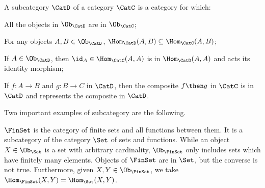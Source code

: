 \begin{ctdefinition}[Subcategory]
\label{def:subcategory}
A subcategory $\CatD$ of a category $\CatC$ is a category for which:
\begin{compactenum}
    \item All the objects in $\Ob_\CatD$ are in $\Ob_\CatC$;
    \item For any objects $A,B\in \Ob_\CatD$, $\Hom_\CatD(A,B)\subseteq \Hom_\CatC(A,B)$;
    \item If $A\in \Ob_\CatD$, then $\id_A\in \Hom_\CatC(A,A)$ is in $\Hom_\CatD(A,A)$ and acts its identity morphism;
    \item If $f\colon A\to B$ and $g\colon B\to C$ in $\CatD$, then the composite $f\then g$ in $\CatC$ is in $\CatD$ and represents the composite in $\CatD$.
\end{compactenum}
\end{ctdefinition}

\begin{comment}
\begin{ctdefinition}[Subcategory]
\label{def:subcategory}
	Given a category~$\Cat{C}$, a \emph{subcategory}~$\Cat{B}$ consists of a subcollection of the collection of objects and morphisms of~$\Cat{C}$ such that:
	\begin{enumerate}[(i)]
	\item If a morphism~$f \colon x\to y$ is in $\Cat{B}$, then so are the objects~$x$ and~$y$.
	\item If the morphisms~$f\colon x\to y$ and~$g\colon y\to z$ are in~$\Cat{B}$, then so is their composite~$f\then g\colon x\to z$.
	\item If~$x$ is in~$\Cat{B}$, then so is the identity morphism~$\text{id}_x$.
	\end{enumerate}
\end{ctdefinition} 
\end{comment}


Two important examples of subcategory are the following. 

\begin{example}
$\FinSet$ is the category of finite sets and all functions between them. It is a subcategory of the category $\Set$ of sets and functions. While an object $X\in \Ob_\Set$ is a set with arbitrary cardinality, $\Ob_{\FinSet}$ only includes sets which have finitely many elements. Objects of $\FinSet$ are in $\Set$, but the converse is not true. Furthermore, given $X,Y\in \Ob_\FinSet$, we take $\Hom_{\FinSet}(X,Y)=\Hom_{\Set}(X,Y)$.
\end{example}



